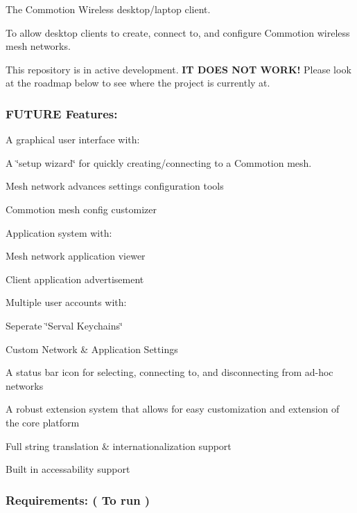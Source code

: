 The Commotion Wireless desktop/laptop client.

To allow desktop clients to create, connect to, and configure Commotion wireless mesh networks.

This repository is in active development. {\bfseries I\-T D\-O\-E\-S N\-O\-T W\-O\-R\-K!} Please look at the roadmap below to see where the project is currently at.

\subsubsection*{F\-U\-T\-U\-R\-E Features\-:}


\begin{DoxyItemize}
\item A graphical user interface with\-:
\item A \char`\"{}setup wizard\char`\"{} for quickly creating/connecting to a Commotion mesh.
\begin{DoxyItemize}
\item Mesh network advances settings configuration tools
\end{DoxyItemize}
\item Commotion mesh config customizer
\item Application system with\-:
\begin{DoxyItemize}
\item Mesh network application viewer
\item Client application advertisement
\end{DoxyItemize}
\item Multiple user accounts with\-:
\begin{DoxyItemize}
\item Seperate \char`\"{}\-Serval Keychains\char`\"{}
\item Custom Network \& Application Settings
\end{DoxyItemize}
\item A status bar icon for selecting, connecting to, and disconnecting from ad-\/hoc networks
\item A robust extension system that allows for easy customization and extension of the core platform
\item Full string translation \& internationalization support
\item Built in accessability support
\end{DoxyItemize}

\subsubsection*{Requirements\-: ( To run )}


